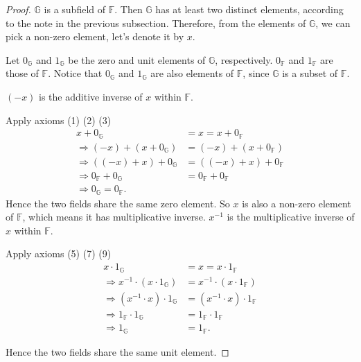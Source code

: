 \begin{proof}
	$\mathbb{G}$ is a subfield of $\mathbb{F}$. Then $\mathbb{G}$ has at least two distinct elements, according to the note in the previous subsection. Therefore, from the elements of $\mathbb{G}$, we can pick a non-zero element, let's denote it by $x$.

	Let $0_{\mathbb{G}}$ and $1_{\mathbb{G}}$ be the zero and unit elements of $\mathbb{G}$, respectively. $0_{\mathbb{F}}$ and $1_{\mathbb{F}}$ are those of $\mathbb{F}$. Notice that $0_{\mathbb{G}}$ and $1_{\mathbb{G}}$ are also elements of $\mathbb{F}$, since $\mathbb{G}$ is a subset of $\mathbb{F}$.

	$(-x)$ is the additive inverse of $x$ within $\mathbb{F}$.

	Apply axioms (1) (2) (3)
	\begin{align*}
		x + 0_{\mathbb{G}}                          & = x = x + 0_{\mathbb{F}}          \\
		\Rightarrow (-x) + (x + 0_{\mathbb{G}})     & = (-x) + (x + 0_{\mathbb{F}})     \\
		\Rightarrow ((-x) + x) + 0_{\mathbb{G}}     & = ((-x) + x) + 0_{\mathbb{F}}     \\
		\Rightarrow 0_{\mathbb{F}} + 0_{\mathbb{G}} & = 0_{\mathbb{F}} + 0_{\mathbb{F}} \\
		\Rightarrow 0_{\mathbb{G}} = 0_{\mathbb{F}}.
	\end{align*}
	Hence the two fields share the same zero element. So $x$ is also a non-zero element of $\mathbb{F}$, which means it has multiplicative inverse. $x^{-1}$ is the multiplicative inverse of $x$ within $\mathbb{F}$.

	Apply axioms (5) (7) (9)
	\begin{align*}
		x\cdot 1_{\mathbb{G}}                           & = x = x\cdot 1_{\mathbb{F}}           \\
		\Rightarrow x^{-1}\cdot (x\cdot 1_{\mathbb{G}}) & = x^{-1}\cdot (x\cdot 1_{\mathbb{F}}) \\
		\Rightarrow (x^{-1}\cdot x)\cdot 1_{\mathbb{G}} & = (x^{-1}\cdot x)\cdot 1_{\mathbb{F}} \\
		\Rightarrow 1_{\mathbb{F}}\cdot 1_{\mathbb{G}}  & = 1_{\mathbb{F}}\cdot 1_{\mathbb{F}}  \\
		\Rightarrow 1_{\mathbb{G}}                      & = 1_{\mathbb{F}}.
	\end{align*}

	Hence the two fields share the same unit element.
\end{proof}

